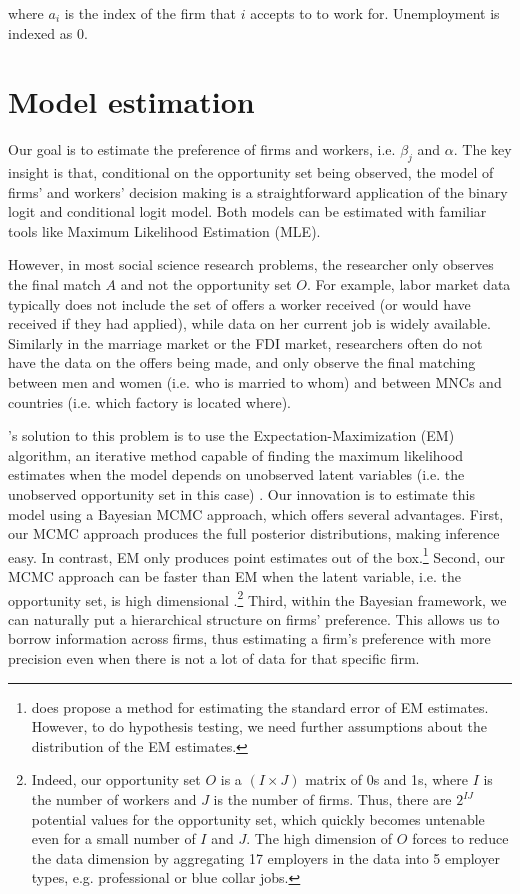 where $a_i$ is the index of the firm that $i$ accepts to to work for. Unemployment
is indexed as 0.

\section{Model estimation}

Our goal is to estimate the preference of firms and workers, i.e. $\beta_j$ and
$\alpha$. The key insight is that, conditional on the opportunity set being
observed, the model of firms' and workers' decision making is a straightforward
application of the binary logit and conditional logit model. Both models can be
estimated with familiar tools like Maximum Likelihood Estimation (MLE).

However, in most social science research problems, the researcher only observes
the final match $A$ and not the opportunity set $O$. For example, labor market
data typically does not include the set of offers a worker received (or would have
received if they had applied), while data on her current job is widely
available. Similarly in the marriage market or the FDI market, researchers often
do not have the data on the offers being made, and only observe the final
matching between men and women (i.e. who is married to whom) and between MNCs
and countries (i.e. which factory is located where).

\citet{Logan1998}'s solution to this problem is to use the
Expectation-Maximization (EM) algorithm, an iterative method capable of
finding the maximum likelihood estimates when the model depends on unobserved
latent variables (i.e. the unobserved opportunity set in this case)
\citep{Dempster1977}. Our innovation is to estimate this model using a Bayesian
MCMC approach, which offers several advantages. First, our MCMC approach
produces the full posterior distributions, making inference easy. In contrast, EM only produces point estimates out of the box.\footnote{\citet{Jamshidian2000} does propose a
  method for estimating the standard error of EM estimates. However, to do
  hypothesis testing, we need further assumptions about the distribution
  of the EM estimates.} Second, our MCMC approach can be faster than EM when the latent variable, i.e. the
opportunity set, is high dimensional \citep{Ryden2008}.\footnote{Indeed, our opportunity set $O$ is a $(I \times J)$ matrix of 0s and 1s,
  where $I$ is the number of workers and $J$ is the number of firms. Thus, there
are $2^{IJ}$ potential values for the opportunity set, which quickly becomes
untenable even for a small number of $I$ and $J$. The high dimension of $O$
forces \citet{Logan1998} to reduce the data dimension by aggregating 17
employers in the data into 5 employer types, e.g. professional or blue collar jobs.} Third,
within the Bayesian framework, we can naturally put a hierarchical structure on
firms' preference. This allows us to borrow information across firms, thus estimating a firm's preference with more
precision even when there is not a lot of data for that specific firm.

